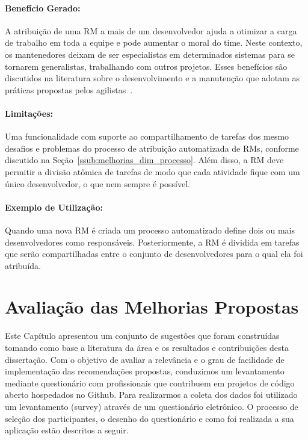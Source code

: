 \paragraph{Benefício Gerado:}
\label{par:papéis_afetados_s08}

A atribuição de uma RM a mais de um desenvolvedor ajuda a otimizar a carga de
trabalho em toda a equipe e pode aumentar o moral do time. Neste contexto, os
mantenedores deixam de ser especialistas em determinados sistemas para se
tornarem generalistas, trabalhando com outros projetos. Esses benefícios são
discutidos na literatura sobre o desenvolvimento e a manutenção que adotam as
práticas propostas pelos agilistas~\cite{dybaa2008empirical,rudzki2009agile}.

\paragraph{Limitações:}
\label{par:limitacoes_s08}

Uma funcionalidade com suporte ao compartilhamento de tarefas dos mesmo desafios
e problemas do processo de atribuição automatizada de RMs, conforme discutido na
Seção~\ref{ssub:melhorias_dim_processo}. Além disso, a RM deve permitir a
divisão atômica de tarefas de modo que cada atividade fique com um único
desenvolvedor, o que nem sempre é possível.

\paragraph{Exemplo de Utilização:}
\label{par:exemplo_de_utilização_s08}

Quando uma nova RM é criada um processo automatizado define dois ou mais
desenvolvedores como responsáveis. Posteriormente, a RM é dividida em tarefas
que serão compartilhadas entre o conjunto de desenvolvedores para o qual ela foi
atribuída.

\section{Avaliação das Melhorias Propostas}
\label{sec:sug_melhoria_avaliacao_das_melhorias}

Este Capítulo apresentou um conjunto de sugestões que foram construídas tomando
como base a literatura da área e os resultados e contribuições desta
dissertação. Com o objetivo de avaliar a relevância e o grau de facilidade de
implementação das recomendações propostas, conduzimos um levantamento mediante
questionário com profissionais que contribuem em projetos de código aberto
hospedados no Github. Para realizarmos a coleta dos dados foi utilizado um
levantamento (survey) através de um questionário eletrônico. O processo de
seleção dos participantes, o desenho do questionário e como foi realizada a sua
aplicação estão descritos a seguir.


